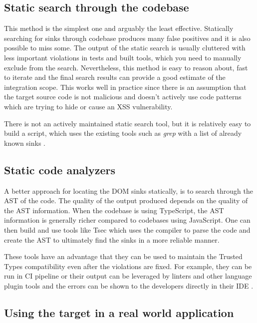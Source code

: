 \subsection{Static search through the codebase}

This method is the simplest one and arguably the least effective. Statically searching for sinks
through codebase produces many false positives and it is also possible to miss some. The output of
the static search is usually cluttered with less important violations in tests and built tools,
which you need to manually exclude from the search. Nevertheless, this method is easy to reason
about, fast to iterate and the final search results can provide a good estimate of the integration
scope. This works well in practice since there is an assumption that the target source code is not
malicious and doesn't actively use code patterns which are trying to hide or cause an XSS
vulnerability.

There is not an actively maintained static search tool, but it is relatively easy to build a script,
which uses the existing tools such as \textit{grep} with a list of already known sinks
\cite{xss_sink_finder}.

\subsection{Static code analyzers}

A better approach for locating the DOM sinks statically, is to search through the AST of the code.
The quality of the output produced depends on the quality of the AST information. When the codebase
is using TypeScript, the AST information is generally richer compared to codebases using JavaScript.
One can then build and use tools like Tsec \cite{tsec_github} which uses the compiler to parse the
code and create the AST to ultimately find the sinks in a more reliable manner.

These tools have an advantage that they can be used to maintain the Trusted Types compatibility even
after the violations are fixed. For example, they can be run in CI pipeline or their output can be
leveraged by linters and other language plugin tools and the errors can be shown to the developers
directly in their IDE \cite{tsec_lsp}.

\subsection{Using the target in a real world application}

